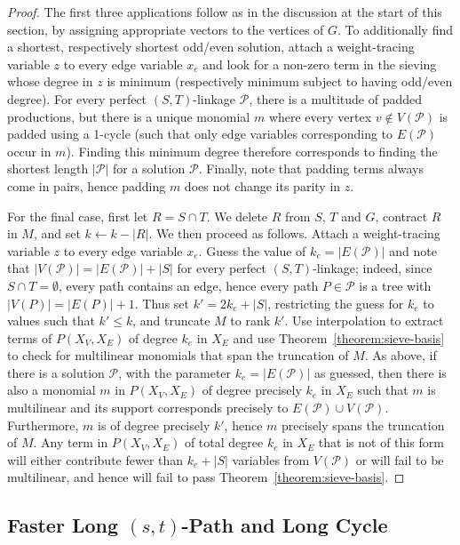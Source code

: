 \documentclass{theoretics}
\newcommand{\cP}{\ensuremath{\mathcal P}\xspace}
\begin{document}
\begin{proof}
  The first three applications follow as in the discussion at the
  start of this section, by assigning appropriate vectors to the
  vertices of $G$. To additionally find a shortest, respectively
  shortest odd/even solution, attach a weight-tracing variable $z$ to
  every edge variable $x_e$ and look for a non-zero term in the
  sieving whose degree in $z$ is minimum (respectively minimum subject
  to having odd/even degree). For every perfect
  $(S,T)$-linkage $\cP$, there is a multitude of padded productions,
  but there is a unique monomial $m$ where every vertex $v
  \notin V(\cP)$ is padded using a 1-cycle (such that only edge
  variables corresponding to $E(\cP)$ occur in $m$).
  Finding this minimum degree therefore corresponds to finding the
  shortest length $|\cP|$ for a solution $\cP$. Finally, note that
  padding terms always come in pairs, hence padding $m$ does not
  change its parity in $z$.

  For the final case, first let $R=S \cap T$. We delete $R$ from $S$,
  $T$ and $G$, contract $R$ in $M$, and set $k \gets k-|R|$. We then proceed as follows.
  Attach a weight-tracing variable $z$ to every edge variable $x_e$.
  Guess the value of $k_e=|E(\cP)|$ and note that $|V(\cP)|=|E(\cP)|+|S|$ 
  for every perfect $(S,T)$-linkage; indeed, since $S \cap T = \emptyset$,
  every path contains an edge, hence every path $P \in \cP$
  is a tree with $|V(P)|=|E(P)|+1$. Thus set $k'=2k_e+|S|$,
  restricting the guess for $k_e$ to values such that $k' \leq k$,
  and truncate $M$ to rank $k'$. Use interpolation to extract terms of
  $P(X_V,X_E)$ of degree $k_e$ in $X_E$ and use Theorem~\ref{theorem:sieve-basis}
  to check for multilinear monomials that span the truncation of $M$. 
  As above, if there is a solution $\cP$, with the parameter
  $k_e=|E(\cP)|$ as guessed, then there is also a monomial $m$ in
  $P(X_V,X_E)$ of degree precisely $k_e$ in $X_E$ such that $m$
  is multilinear and its support corresponds precisely to $E(\cP) \cup
  V(\cP)$. Furthermore, $m$ is of degree precisely $k'$,
  hence $m$ precisely spans the truncation of $M$. 
  Any term in $P(X_V,X_E)$ of total degree $k_e$ in $X_E$ that is not of this form
  will either contribute fewer than $k_e+|S|$ variables from $V(\cP)$
  or will fail to be multilinear, and hence will fail to pass
  Theorem~\ref{theorem:sieve-basis}. 
\end{proof}

\subsection{Faster Long \texorpdfstring{$(s,t)$}{(s,t)}-Path and Long Cycle}
\end{document}
